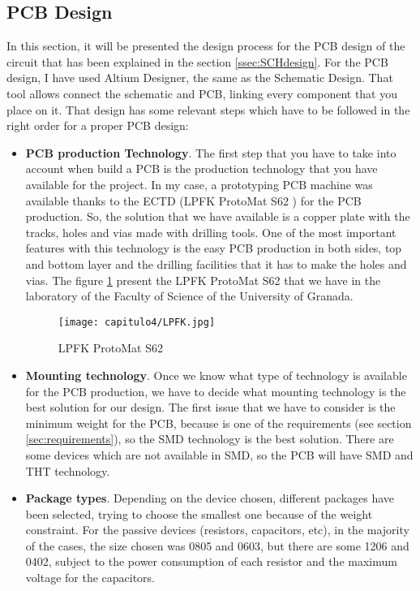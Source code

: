 \subsection{\acrshort{PCB} Design} \label{ssec:PCBdesign}
In this section, it will be presented the design process for the \acrshort{PCB} design of the circuit that has been explained in the section \ref{ssec:SCHdesign}. For the \acrshort{PCB} design, I have used Altium Designer, the same as the Schematic Design. That tool allows connect the schematic and \acrshort{PCB}, linking every component that you place on it. That design has some relevant steps which have to be followed in the right order for a proper \acrshort{PCB} design:

\begin{itemize}
\item \textbf{\acrshort{PCB} production Technology}. The first step that you have to take into account when build a \acrshort{PCB} is the production technology that you have available for the project. In my case, a prototyping \acrshort{PCB} machine was available thanks to the \acrshort{ECTD} (LPFK ProtoMat S62 \cite{LPFK}) for the \acrshort{PCB} production. So, the solution that we have available is a copper plate with the tracks, holes and vias made with drilling tools.
One of the most important features with this technology is the easy \acrshort{PCB} production in both sides, top and bottom layer and the drilling facilities that it has to make the holes and vias. The figure \ref{fig:LPFK} present the LPFK ProtoMat S62 that we have in the laboratory of the Faculty of Science of the University of Granada.

\begin{figure}[H]
	\centering
		\texttt{[image: capitulo4/LPFK.jpg]}
	\caption{LPFK ProtoMat S62}
	\label{fig:LPFK}
\end{figure}

\item \textbf{Mounting technology}. Once we know what type of technology is available for the \acrshort{PCB} production, we have to decide what mounting technology is the best solution for our design. The first issue that we have to consider is the minimum weight for the \acrshort{PCB}, because is one of the requirements (see section \ref{sec:requirements}), so the \acrshort{SMD} technology is the best solution. There are some devices which are not available in \acrshort{SMD}, so the \acrshort{PCB} will have \acrshort{SMD} and \acrshort{THT} technology.

\item \textbf{Package types}. Depending on the device chosen, different packages have been selected, trying to choose the smallest one because of the weight constraint. For the passive devices (resistors, capacitors, etc), in the majority of the cases, the size chosen was 0805 and 0603, but there are some 1206 and 0402, subject to the power consumption of each resistor and the maximum voltage for the capacitors.


\end{itemize}
